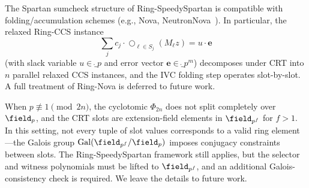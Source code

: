 The Spartan sumcheck structure of Ring-SpeedySpartan is compatible with folding/accumulation schemes (e.g., Nova, NeutronNova~\cite{neutron-nova}). In particular, the relaxed Ring-CCS instance
\[
    \sum_j c_j \cdot \bigcirc_{\ell \in S_j} (M_\ell z) = u \cdot \mathbf{e}
\]
(with slack variable $u \in \ring_p$ and error vector $\mathbf{e} \in \ring_p^m$) decomposes under CRT into $n$ parallel relaxed CCS instances, and the IVC folding step operates slot-by-slot. A full treatment of Ring-Nova is deferred to future work.

When $p \not\equiv 1 \pmod{2n}$, the cyclotomic $\Phi_{2n}$ does not split completely over $\field_p$, and the CRT slots are extension-field elements in $\field_{p^f}$ for $f > 1$.
In this setting, not every tuple of slot values corresponds to a valid ring element---the Galois group $\mathrm{Gal}(\field_{p^f}/\field_p)$ imposes conjugacy constraints between slots.
The Ring-SpeedySpartan framework still applies, but the selector and witness polynomials must be lifted to $\field_{p^f}$, and an additional Galois-consistency check is required. We leave the details to future work.